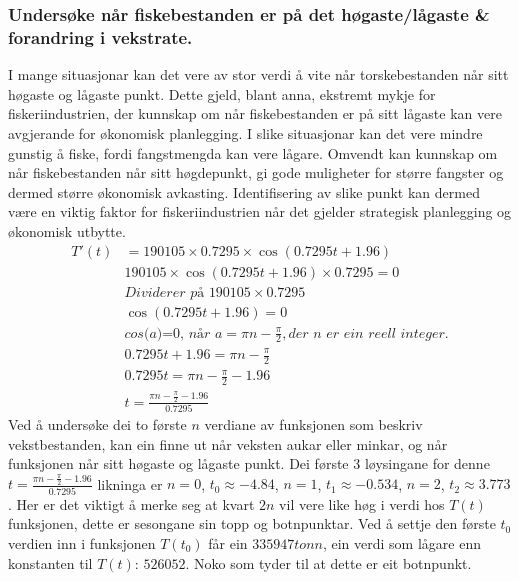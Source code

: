\documentclass{report}
\begin{document}
\subsubsection{Undersøke når fiskebestanden er på det høgaste/lågaste \& forandring i vekstrate.}
I mange situasjonar kan det vere av stor verdi å vite når torskebestanden når sitt høgaste og lågaste punkt. Dette gjeld, blant anna, ekstremt mykje for fiskeriindustrien, der kunnskap om når fiskebestanden er på sitt lågaste kan vere avgjerande for økonomisk planlegging. I slike situasjonar kan det vere mindre gunstig å fiske, fordi fangstmengda kan vere lågare. Omvendt kan kunnskap om når fiskebestanden når sitt høgdepunkt, gi gode muligheter for større fangster og dermed større økonomisk avkasting. Identifisering av slike punkt kan dermed være en viktig faktor for fiskeriindustrien når det gjelder strategisk planlegging og økonomisk utbytte.
\begin{align*}
	T'(t) & = 190105 \times 0.7295 \times \cos(0.7295t+1.96)                                    \\
	      & 190105 \times \cos(0.7295t+1.96)\times 0.7295 =0                                    \\
	      & \textit{Dividerer på } 190105\times 0.7295                                          \\
	      & \cos(0.7295t+1.96) =0                                                               \\
	      & \textit{cos(a)=0, når } a=\pi n-\frac{\pi}{2}, \textit{der n er ein reell integer.} \\
	      & 0.7295t+1.96 = \pi n -\frac{\pi}{2}                                                 \\
	      & 0.7295t = \pi n - \frac{\pi}{2}-1.96                                                \\
	      & t = \frac{\pi n - \frac{\pi}{2}-1.96}{0.7295}
\end{align*}
Ved å undersøke dei to første $n$ verdiane av funksjonen som beskriv vekstbestanden, kan ein finne ut når veksten aukar eller minkar, og når funksjonen når sitt høgaste og lågaste punkt.
Dei første 3 løysingane for denne $t=\frac{\pi n - \frac{\pi}{2}-1.96}{0.7295}$ likninga er $n=0$, $t_0\approx -4.84$, $n=1$, $t_1\approx -0.534$, $n=2$, $t_2\approx 3.773$.
Her er det viktigt å merke seg at kvart $2n$ vil vere like høg i verdi hos $T(t)$ funksjonen, dette er sesongane sin topp og botnpunktar.
Ved å settje den første $t_0$ verdien inn i funksjonen $T(t_0)$ får ein $335947tonn$, ein verdi som lågare enn konstanten til $T(t)$: $526052$. Noko som tyder til at dette er eit botnpunkt.
\end{document}
